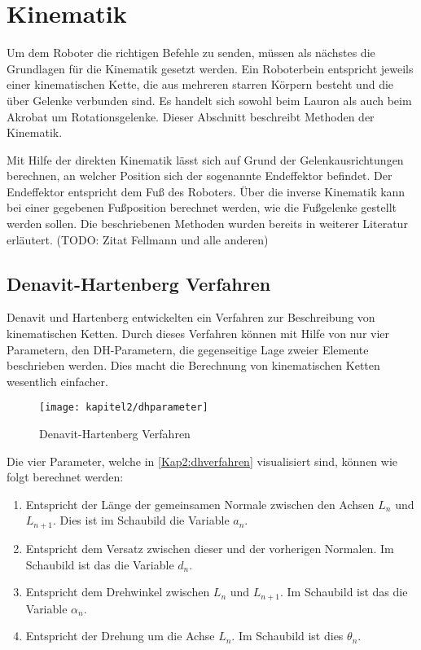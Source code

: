 \section{Kinematik}

Um dem Roboter die richtigen Befehle zu senden, müssen als nächstes die Grundlagen für die Kinematik gesetzt werden. Ein Roboterbein entspricht jeweils einer kinematischen Kette, die aus mehreren starren Körpern besteht und die über Gelenke verbunden sind. Es handelt sich sowohl beim Lauron als auch beim Akrobat um Rotationsgelenke. Dieser Abschnitt beschreibt Methoden der Kinematik.

Mit Hilfe der direkten Kinematik lässt sich auf Grund der Gelenkausrichtungen berechnen, an welcher Position sich der sogenannte Endeffektor befindet. Der Endeffektor entspricht dem Fuß des Roboters. Über die inverse Kinematik kann bei einer gegebenen Fußposition berechnet werden, wie die Fußgelenke gestellt werden sollen. Die beschriebenen Methoden wurden bereits in weiterer Literatur erläutert. (TODO: Zitat Fellmann und alle anderen) \autocite{fellmann2007}

\subsection{Denavit-Hartenberg Verfahren}

Denavit und Hartenberg entwickelten ein Verfahren zur Beschreibung von kinematischen Ketten. Durch dieses Verfahren können mit Hilfe von nur vier Parametern, den DH-Parametern, die gegenseitige Lage zweier Elemente beschrieben werden. Dies macht die Berechnung von kinematischen Ketten wesentlich einfacher.

\begin{figure}[t!]
  \centering
  \texttt{[image: kapitel2/dhparameter]}
  \caption{Denavit-Hartenberg Verfahren}
  \label{Kap2:dhverfahren}
\end{figure}

Die vier Parameter, welche in \autoref{Kap2:dhverfahren} visualisiert sind, können wie folgt berechnet werden:
\begin{enumerate}
  \item Entspricht der Länge der gemeinsamen Normale zwischen den Achsen $L_n$ und $L_{n+1}$. Dies ist im Schaubild die Variable $a_n$.
  \item Entspricht dem Versatz zwischen dieser und der vorherigen Normalen. Im Schaubild ist das die Variable $d_n$.
  \item Entspricht dem Drehwinkel zwischen $L_n$ und $L_{n+1}$. Im Schaubild ist das die Variable $\alpha_n$.
  \item Entspricht der Drehung um die Achse $L_n$. Im Schaubild ist dies $\theta_n$.
\end{enumerate} 

